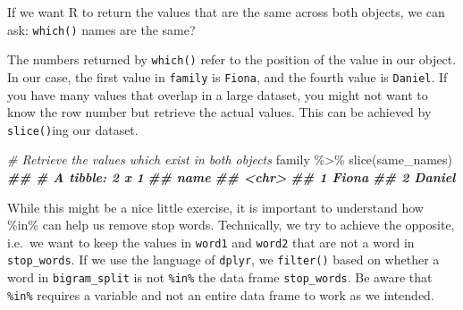 \documentclass[
]{book}
\newenvironment{Shaded}{\begin{snugshade}}{\end{snugshade}}
\newcommand{\CommentTok}[1]{\textcolor[rgb]{0.56,0.35,0.01}{\textit{#1}}}
\newcommand{\DocumentationTok}[1]{\textcolor[rgb]{0.56,0.35,0.01}{\textbf{\textit{#1}}}}
\newcommand{\FunctionTok}[1]{\textcolor[rgb]{0.00,0.00,0.00}{#1}}
\newcommand{\NormalTok}[1]{#1}
\newcommand{\OtherTok}[1]{\textcolor[rgb]{0.56,0.35,0.01}{#1}}
\newcommand{\SpecialCharTok}[1]{\textcolor[rgb]{0.00,0.00,0.00}{#1}}
\begin{document}
If we want R to return the values that are the same across both objects, we can ask: \texttt{which()} names are the same?

\begin{Shaded}
\end{Shaded}

The numbers returned by \texttt{which()} refer to the position of the value in our object. In our case, the first value in \texttt{family} is \texttt{Fiona}, and the fourth value is \texttt{Daniel}. If you have many values that overlap in a large dataset, you might not want to know the row number but retrieve the actual values. This can be achieved by \texttt{slice()}ing our dataset.

\begin{Shaded}
\begin{Highlighting}[]
\CommentTok{\# Retrieve the values which exist in both objects}
\NormalTok{family }\SpecialCharTok{\%\textgreater{}\%}
  \FunctionTok{slice}\NormalTok{(same\_names)}
\DocumentationTok{\#\# \# A tibble: 2 x 1}
\DocumentationTok{\#\#   name  }
\DocumentationTok{\#\#   \textless{}chr\textgreater{} }
\DocumentationTok{\#\# 1 Fiona }
\DocumentationTok{\#\# 2 Daniel}
\end{Highlighting}
\end{Shaded}

While this might be a nice little exercise, it is important to understand how \%in\% can help us remove stop words. Technically, we try to achieve the opposite, i.e.~we want to keep the values in \texttt{word1} and \texttt{word2} that are not a word in \texttt{stop\_words}. If we use the language of \texttt{dplyr}, we \texttt{filter()} based on whether a word in \texttt{bigram\_split} is not \texttt{\%in\%} the data frame \texttt{stop\_words}. Be aware that \texttt{\%in\%} requires a variable and not an entire data frame to work as we intended.
\end{document}
